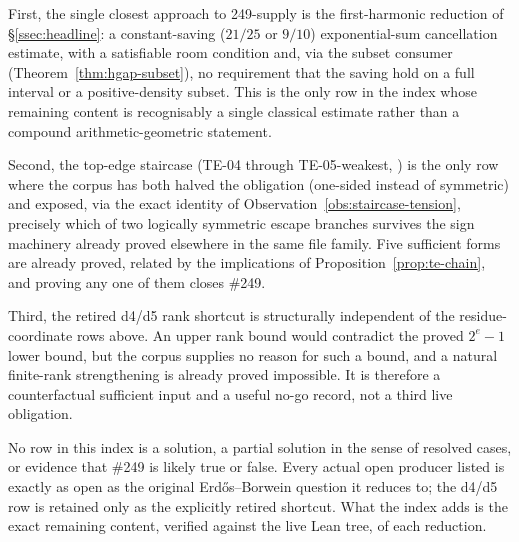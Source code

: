First, the single closest approach to 249-supply is the first-harmonic reduction of
\S\ref{ssec:headline}: a constant-saving ($21/25$ or $9/10$) exponential-sum cancellation estimate,
with a satisfiable room condition and, via the subset consumer
(Theorem~\ref{thm:hgap-subset}), no requirement that the saving hold on a full interval or a
positive-density subset. This is the only row in the index whose remaining content is recognisably
a single classical estimate rather than a compound arithmetic-geometric statement.

Second, the top-edge staircase (TE-04 through TE-05-weakest, ) is the
only row where the corpus has both halved the obligation (one-sided instead of symmetric) and
exposed, via the exact identity of Observation~\ref{obs:staircase-tension}, precisely which of two
logically symmetric escape branches survives the sign machinery already proved elsewhere in the
same file family. Five sufficient forms are already proved, related by the implications of
Proposition~\ref{prop:te-chain}, and proving any one of them closes \#249.

Third, the retired d4/d5 rank shortcut is structurally independent of the
residue-coordinate rows above.  An upper rank bound would contradict the
proved $2^e{-}1$ lower bound, but the corpus supplies no reason for such a
bound, and a natural finite-rank strengthening is already proved impossible.
It is therefore a counterfactual sufficient input and a useful no-go record,
not a third live obligation.

No row in this index is a solution, a partial solution in the sense of resolved cases, or evidence
that \#249 is likely true or false. Every actual open producer listed is exactly as open as the
original Erd\H{o}s--Borwein question it reduces to; the d4/d5 row is retained only as the
explicitly retired shortcut. What the index adds is the exact remaining content, verified against
the live Lean tree, of each reduction.
